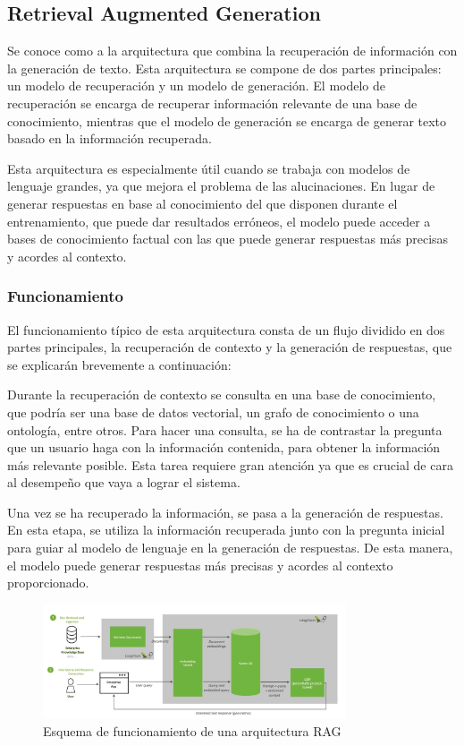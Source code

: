 \subsection{Retrieval Augmented Generation}
Se conoce como  a la arquitectura que combina la recuperación de información con la generación de texto. Esta arquitectura se compone de dos partes principales: un modelo de recuperación y un modelo de generación. El modelo de recuperación se encarga de recuperar información relevante de una base de conocimiento, mientras que el modelo de generación se encarga de generar texto basado en la información recuperada.

Esta arquitectura es especialmente útil cuando se trabaja con modelos de lenguaje grandes, ya que mejora el problema de las alucinaciones. En lugar de generar respuestas en base al conocimiento del que disponen durante el entrenamiento, que puede dar resultados erróneos, el modelo puede acceder a bases de conocimiento factual con las que puede generar respuestas más precisas y acordes al contexto.

\subsubsection{Funcionamiento}
El funcionamiento típico de esta arquitectura consta de un flujo dividido en dos partes principales, la recuperación de contexto y la generación de respuestas, que se explicarán brevemente a continuación:

Durante la recuperación de contexto se consulta en una base de conocimiento, que podría ser una base de datos vectorial, un grafo de conocimiento o una ontología, entre otros. Para hacer una consulta, se ha de contrastar la pregunta que un usuario haga con la información contenida, para obtener la información más relevante posible. Esta tarea requiere gran atención ya que es crucial de cara al desempeño que vaya a lograr el sistema.

Una vez se ha recuperado la información, se pasa a la generación de respuestas. En esta etapa, se utiliza la información recuperada junto con la pregunta inicial para guiar al modelo de lenguaje en la generación de respuestas. De esta manera, el modelo puede generar respuestas más precisas y acordes al contexto proporcionado.

\begin{figure}[!h]
    \centering
    \includegraphics[width=0.8\textwidth]{images/rag.jpg}
    \caption{Esquema de funcionamiento de una arquitectura RAG~\cite{nvidiaBlog}}
    \label{fig:rag}
\end{figure}